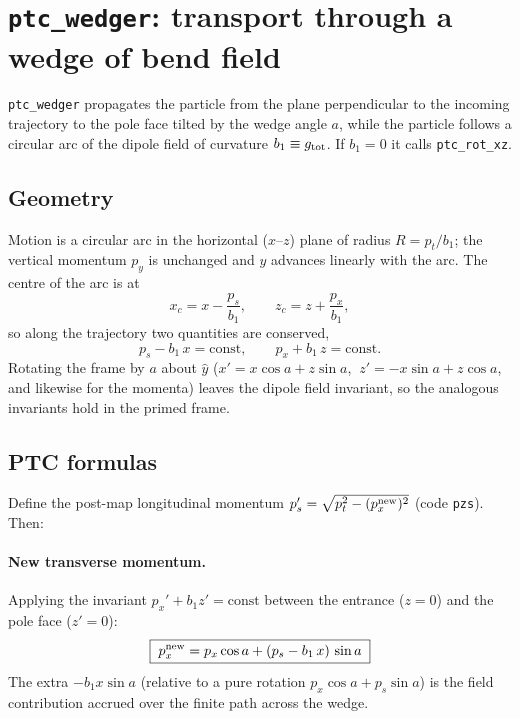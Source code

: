 \documentclass[11pt]{article}
\newcommand{\code}[1]{\texttt{#1}}
\begin{document}
\section{\code{ptc\_wedger}: transport through a wedge of bend field}

\code{ptc\_wedger} propagates the particle from the plane perpendicular to the
incoming trajectory to the pole face tilted by the wedge angle $a$, while the
particle follows a circular arc of the dipole field of curvature
$b_1 \equiv g_{\rm tot}$. If $b_1 = 0$ it calls \code{ptc\_rot\_xz}.

\subsection{Geometry}

Motion is a circular arc in the horizontal ($x$--$z$) plane of radius
$R = p_t/b_1$; the vertical momentum $p_y$ is unchanged and $y$ advances linearly
with the arc. The centre of the arc is at
\begin{equation}
  x_c = x - \frac{p_s}{b_1}, \qquad z_c = z + \frac{p_x}{b_1},
\end{equation}
so along the trajectory two quantities are conserved,
\begin{equation}
  p_s - b_1\,x = \text{const}, \qquad p_x + b_1\,z = \text{const}.
  \label{eq:inv}
\end{equation}
Rotating the frame by $a$ about $\hat y$
($x' = x\cos a + z\sin a$, $\ z' = -x\sin a + z\cos a$, and likewise for the
momenta) leaves the dipole field invariant, so the analogous invariants hold in
the primed frame.

\subsection{PTC formulas}

Define the post-map longitudinal momentum
$p_s' = \sqrt{p_t^2 - (p_x^{\rm new})^2}$ (code \code{pzs}). Then:

\paragraph{New transverse momentum.} Applying the invariant
$p_x' + b_1 z' = \text{const}$ between the entrance ($z=0$) and the pole face
($z'=0$):
\begin{equation}
  \boxed{\; p_x^{\rm new} = p_x\cos a + (p_s - b_1\,x)\,\sin a \;}
  \label{eq:wedgepx}
\end{equation}
The extra $-b_1 x\sin a$ (relative to a pure rotation $p_x\cos a + p_s\sin a$) is
the field contribution accrued over the finite path across the wedge.
\end{document}
